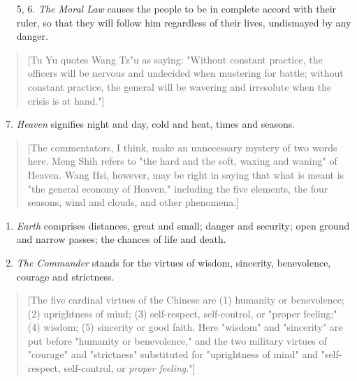 \documentclass[10pt,a4paper]{book}
\begin{document}
\begin{enumerate}[leftmargin=*, label=\arabic*., resume]
\item[5, 6.] \textit{The Moral Law} causes the people to be in complete accord with their ruler, so that they will follow him regardless of their lives, undismayed by any danger.
\end{enumerate}

{\small
\begin{quote}
[Tu Yu quotes Wang Tz"u as saying: "Without constant practice, the officers will be nervous and undecided when mustering for battle; without constant practice, the general will be wavering and irresolute when the crisis is at hand."]
\end{quote}
}

\begin{enumerate}[leftmargin=*, label=\arabic*., resume]
    \setcounter{enumi}{6}
\item \textit{Heaven} signifies night and day, cold and heat, times and seasons.
\end{enumerate}

{\small
\begin{quote}
[The commentators, I think, make an unnecessary mystery of two words here. Meng Shih refers to "the hard and the soft, waxing and waning" of Heaven. Wang Hsi, however, may be right in saying that what is meant is "the general economy of Heaven," including the five elements, the four seasons, wind and clouds, and other phenomena.]
\end{quote}
}

\begin{enumerate}[leftmargin=*, label=\arabic*., resume]

\item \textit{Earth} comprises distances, great and small; danger and security; open ground and narrow passes; the chances of life and death.

\item \textit{The Commander} stands for the virtues of wisdom, sincerity, benevolence, courage and strictness.

\end{enumerate}

{\small
\begin{quote}
[The five cardinal virtues of the Chinese are (1) humanity or benevolence; (2) uprightness of mind; (3) self-respect, self-control, or "proper feeling;" (4) wisdom; (5) sincerity or good faith. Here "wisdom" and "sincerity" are put before "humanity or benevolence," and the two military virtues of "courage" and "strictness" substituted for "uprightness of mind" and "self-respect, self-control, or \textit{proper feeling}."]
\end{quote}
}
\end{document}
